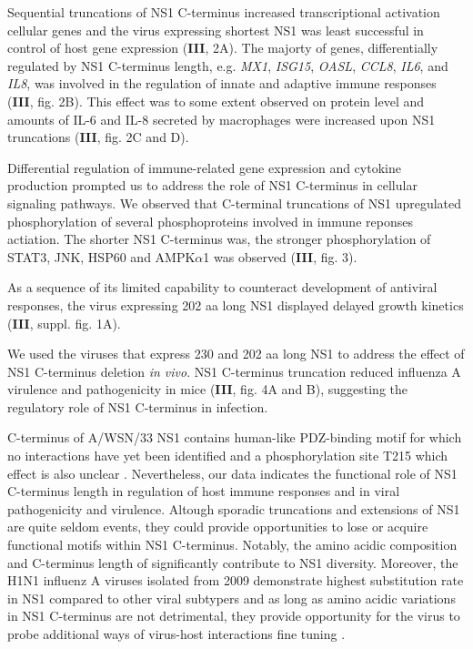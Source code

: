 		Sequential truncations of NS1 C-terminus increased transcriptional activation cellular genes and the virus expressing shortest NS1 was least successful in control of host gene expression (\textbf{III}, 2A). The majorty of genes, differentially regulated by NS1 C-terminus length, e.g. \textit{MX1}, \textit{ISG15}, \textit{OASL}, \textit{CCL8}, \textit{IL6}, and \textit{IL8}, was involved in the regulation of innate and adaptive immune responses (\textbf{III}, fig. 2B).  This effect was to some extent observed on protein level and amounts of IL-6 and IL-8 secreted by macrophages were increased upon NS1 truncations (\textbf{III}, fig. 2C and D). 
		
		Differential regulation of immune-related gene expression and cytokine production prompted us to address the role of NS1 C-terminus in cellular signaling pathways. We observed that C-terminal truncations of NS1 upregulated phosphorylation of several phosphoproteins involved in immune reponses actiation. The shorter NS1 C-terminus was, the stronger phosphorylation of STAT3, JNK, HSP60 and AMPK$\alpha$1 was observed (\textbf{III}, fig. 3). 
		
		As a sequence of its limited capability to counteract development of antiviral responses, the virus expressing 202 aa long NS1 displayed delayed growth kinetics (\textbf{III}, suppl. fig. 1A).
		
		We used the viruses that express 230 and 202 aa long NS1 to address the effect of NS1 C-terminus deletion \textit{in vivo}. NS1 C-terminus truncation reduced influenza A virulence and pathogenicity in mice (\textbf{III}, fig. 4A and B), suggesting the regulatory role of NS1 C-terminus in infection.
		
		C-terminus of A/WSN/33 NS1 contains human-like PDZ-binding motif for which no interactions have yet been identified and a phosphorylation site T215 which effect is also unclear \parencite{Jackson2010, Hsiang2012}. Nevertheless, our data indicates the functional role of NS1 C-terminus length in regulation of host immune responses and in viral pathogenicity and virulence. Altough sporadic truncations and extensions of NS1 are quite seldom events, they could provide opportunities to lose or acquire functional motifs within NS1 C-terminus. Notably, the amino acidic composition and C-terminus length of significantly contribute to NS1 diversity. Moreover, the H1N1 influenz A viruses isolated from 2009 demonstrate highest substitution rate in NS1 compared to other viral subtypers and as long as amino acidic variations in NS1 C-terminus are not detrimental, they provide opportunity for the virus to probe additional ways of virus-host interactions fine tuning \parencite{Xu2011}. 
		 
